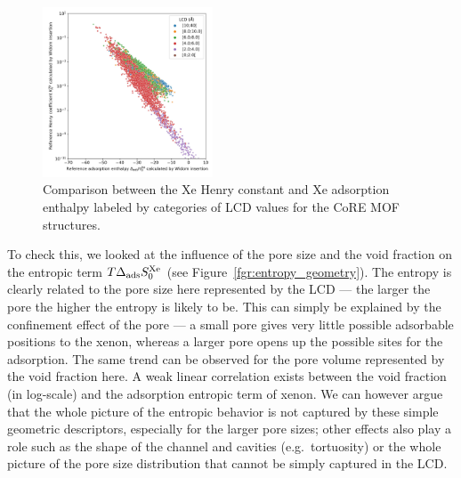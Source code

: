 \documentclass[main.tex]{subfiles}
\begin{document}
\begin{figure}
  \centering
  \includegraphics[width=0.45\textwidth]{figures/2-thermo/H_Xe_widom_vs_K_Xe_widom_overview.jpg}
  \caption{Comparison between the Xe Henry constant and Xe adsorption enthalpy labeled by categories of LCD values for the CoRE MOF structures.}\label{fgr:henry_enthalpy}
\end{figure}

To check this, we looked at the influence of the pore size and the void fraction on the entropic term $T\Delta_{\text{ads}}S^{\text{Xe}}_{\text{0}}$ (see Figure~\ref{fgr:entropy_geometry}). The entropy is clearly related to the pore size here represented by the LCD --- the larger the pore the higher the entropy is likely to be. This can simply be explained by the confinement effect of the pore --- a small pore gives very little possible adsorbable positions to the xenon, whereas a larger pore opens up the possible sites for the adsorption. The same trend can be observed for the pore volume represented by the void fraction here. A weak linear correlation exists between the void fraction (in log-scale) and the adsorption entropic term of xenon. We can however argue that the whole picture of the entropic behavior is not captured by these simple geometric descriptors, especially for the larger pore sizes; other effects also play a role such as the shape of the channel and cavities (e.g.\ tortuosity) or the whole picture of the pore size distribution that cannot be simply captured in the LCD.
\end{document}

